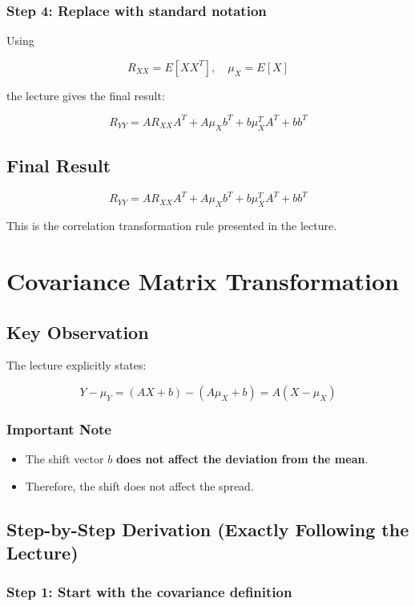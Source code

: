 \documentclass[12pt]{article}
\begin{document}
\subsubsection*{Step 4: Replace with standard notation}

Using

\[
R_{XX} = E[XX^T], \quad \mu_X = E[X]
\]

the lecture gives the final result:

\[
R_{YY} = A R_{XX} A^T + A\mu_X b^T + b\mu_X^T A^T + bb^T
\]

\subsection{Final Result}

\[
\boxed{R_{YY} = A R_{XX} A^T + A\mu_X b^T + b\mu_X^T A^T + bb^T}
\]

This is the correlation transformation rule presented in the lecture.

\section{Covariance Matrix Transformation}

\subsection{Key Observation}

The lecture explicitly states:

\[
Y - \mu_Y = (AX + b) - (A\mu_X + b) = A(X - \mu_X)
\]

\subsubsection*{Important Note}

\begin{itemize}
    \item The shift vector \(b\) \textbf{does not affect the deviation from the mean}.
    \item Therefore, the shift does not affect the spread.
\end{itemize}

\subsection{Step-by-Step Derivation (Exactly Following the Lecture)}

\subsubsection*{Step 1: Start with the covariance definition}
\end{document}
